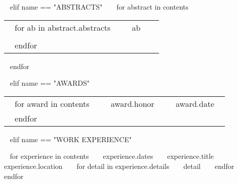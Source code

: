 \begin{minipage}{\textwidth}
%

~{ elif name == "ABSTRACTS" }~
~{ for abstract in contents }~
  \begin{tabular}{ p{} %
                   p{} 
                   p{}} %
  ~{ for ab in abstract.abstracts }~
  \small\textcolor{gray}{{\emph{  }}} & {~{{ ab }}~} & {\hfill \small{ }} \\ \\
  ~{ endfor }~
  \end{tabular}
~{ endfor }~

%

~{ elif name == "AWARDS" }~

\begin{tabular}{ p{} %
                 p{} 
                 p{}} %
  ~{ for award in contents }~
  \small\textcolor{gray}{{\emph{  }}} & ~{{ award.honor }}~ & {\hfill \small{~{{ award.date }}~}}\\
  ~{ endfor }~
\end{tabular}


~{ elif name == "WORK EXPERIENCE" }~
\begin{entrylist}
~{ for experience in contents }~
  \entry
    {~{{ experience.dates }}~}
    {~{{ experience.title }}~}
    {~{{ experience.location }}~}
    {~{ for detail in experience.details }~ ~{{ detail }}~ ~{ endfor }~}
~{ endfor }~
\end{entrylist}
  


\end{minipage}
